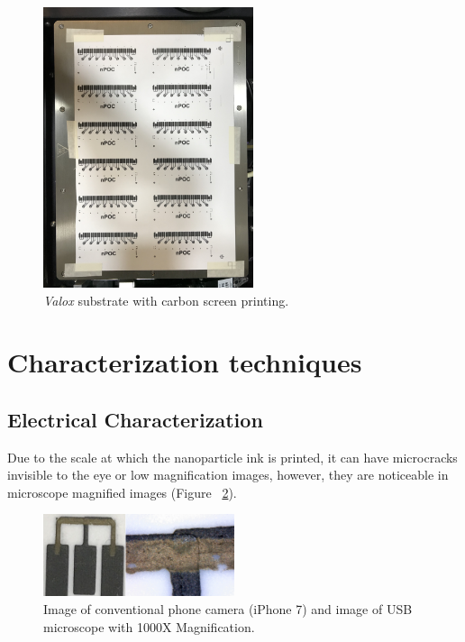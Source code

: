 \begin{figure}[H]
  \centering
    \includegraphics[width=0.55\textwidth]{Figures/Figura_Valox}
  \caption{\textit{Valox} substrate with carbon screen printing.}
  \label{fig:Figura_Valox}
\end{figure}

\section{Characterization techniques}
\subsection{Electrical Characterization}\label{subsec:carac_elec}
Due to the scale at which the nanoparticle ink is printed, it can have microcracks invisible to the eye or low magnification images, however, they are noticeable in microscope magnified images (Figure ~\ref{fig:Figura_Carac_elec}).

\begin{figure}[H]
  \centering
    \includegraphics[width=0.5\textwidth]{Figures/Figura_Carac_elec}
  \caption{Image of conventional phone camera (iPhone 7) and image of USB microscope with 1000X Magnification.}
  \label{fig:Figura_Carac_elec}
\end{figure}

